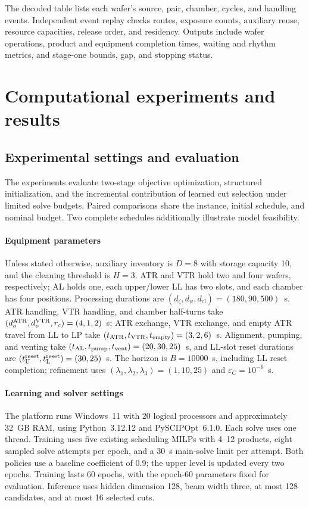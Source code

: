 \documentclass[final,5p,times,twocolumn]{elsarticle}
\begin{document}
The decoded table lists each wafer's source, pair, chamber, cycles, and handling events. Independent event replay checks routes, exposure counts, auxiliary reuse, resource capacities, release order, and residency. Outputs include wafer operations, product and equipment completion times, waiting and rhythm metrics, and stage-one bounds, gap, and stopping status.

\section{Computational experiments and results}
\label{sec:experiments-cn}
\subsection{Experimental settings and evaluation}
\label{sec:experiment-settings-cn}
The experiments evaluate two-stage objective optimization, structured initialization, and the incremental contribution of learned cut selection under limited solve budgets. Paired comparisons share the instance, initial schedule, and nominal budget. Two complete schedules additionally illustrate model feasibility.

\paragraph{Equipment parameters}
Unless stated otherwise, auxiliary inventory is $D=8$ with storage capacity 10, and the cleaning threshold is $H=3$. ATR and VTR hold two and four wafers, respectively; AL holds one, each upper/lower LL has two slots, and each chamber has four positions. Processing durations are $(d_\zeta,d_\psi,d_{\mathrm{cl}})=(180,90,500)$~s. ATR handling, VTR handling, and chamber half-turns take $(d_o^{\rm ATR},d_o^{\rm VTR},r_c)=(4,1,2)$~s; ATR exchange, VTR exchange, and empty ATR travel from LL to LP take $(t_{\rm ATR},t_{\rm VTR},t_{\rm empty})=(3,2,6)$~s. Alignment, pumping, and venting take $(t_{\rm AL},t_{\rm pump},t_{\rm vent})=(20,30,25)$~s, and LL-slot reset durations are $(t_{\rm U}^{\rm reset},t_{\rm L}^{\rm reset})=(30,25)$~s. The horizon is $B=10000$~s, including LL reset completion; refinement uses $(\lambda_1,\lambda_2,\lambda_3)=(1,10,25)$ and $\varepsilon_C=10^{-6}$~s.

\paragraph{Learning and solver settings}
The platform runs Windows~11 with 20 logical processors and approximately 32~GB RAM, using Python~3.12.12 and PySCIPOpt~6.1.0. Each solve uses one thread. Training uses five existing scheduling MILPs with 4--12 products, eight sampled solve attempts per epoch, and a 30~s main-solve limit per attempt. Both policies use a baseline coefficient of 0.9; the upper level is updated every two epochs. Training lasts 60 epochs, with the epoch-60 parameters fixed for evaluation. Inference uses hidden dimension 128, beam width three, at most 128 candidates, and at most 16 selected cuts.
\end{document}
